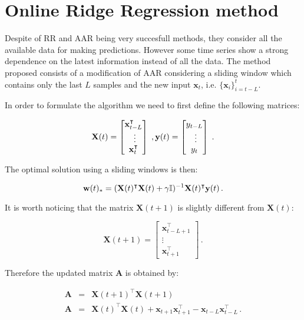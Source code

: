 \section{Online Ridge Regression method} \label{sec:proposal}

Despite of RR and AAR being very succesfull methods, they consider all
the available data for making predictions. 
However some time series show a strong dependence on the latest
information instead of all the data.  The method proposed consists of
a modification of AAR considering a sliding window which contains only
the last $L$ samples and the new input $\mathbf{x}_t$, i.e.
$\{\mathbf{x}_i\}_{i=t-L}^t$. 

In order to formulate the algorithm we need to first define the
following matrices:
 
\[
\mathbf{X}(t) = 
\begin{bmatrix} 
\mathbf{x}_{t-L}^\intercal \\ \vdots \\ \mathbf{x}_t^\intercal
\end{bmatrix} \; , 
{\bf y}(t) = \begin{bmatrix} y_{t-L} \\ \vdots \\ y_t \end{bmatrix} \; .
\]

The optimal solution using a sliding windows is then:

\begin{equation}
\label{eq:optsolSLAAR}
{\bf w}(t)_*=({\bf X}(t)^\intercal{\bf X}(t)+\gamma
\mathbb{I})^{-1}{\bf X}(t)^\intercal{\bf y}(t) \, .
\end{equation}

It is worth noticing that the matrix $\mathbf{X}(t+1)$ is slightly different
from $\mathbf{X}(t)$:

\begin{equation} \label{eq:recform}
\mathbf{X}(t+1) = 
\begin{bmatrix} \mathbf{x}_{t-L+1}^\intercal \\ \vdots \\
\mathbf{x}_{t+1}^\intercal
\end{bmatrix} \, .
\end{equation}

Therefore the updated matrix $\mathbf{A}$ is obtained by:

\begin{eqnarray*}
\mathbf{A}&=&\mathbf{X}(t+1)^\intercal
\mathbf{X}(t+1) \\
\mathbf{A}&=&\mathbf{X}(t)^\intercal \mathbf{X}(t) +  \mathbf{x}_{t+1}
\mathbf{x}_{t+1}^\intercal -
\mathbf{x}_{t-L} \mathbf{x}_{t-L}^\intercal \, .
\end{eqnarray*}

